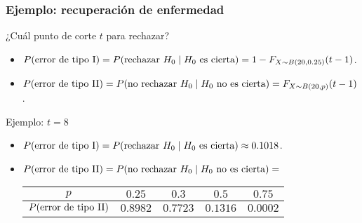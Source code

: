 \documentclass[table]{beamer}
\begin{document}
\begin{frame}
    \frametitle{Ejemplo: recuperación de enfermedad}
    \begin{block}{¿Cuál punto de corte $t$ para rechazar?}
        \begin{itemize}
            \item $\prob{\text{error de tipo I}} = \prob{\text{rechazar } H_{0} \mid H_{0} \text{ es cierta}}
                    = 1 - \pFF{X \sim \binomial{20}{0.25}}{t - 1}$.
            \item $\prob{\text{error de tipo II}} = \prob{\text{no rechazar } H_{0} \mid H_{0} \text{ no es cierta}} = \pFF{X \sim \binomial{20}{p}}{t - 1}$.
        \end{itemize}
    \end{block}
    \begin{exampleblock}{Ejemplo: $t = 8$}
        \begin{itemize}
            \item $\prob{\text{error de tipo I}} = \prob{\text{rechazar } H_{0} \mid H_{0} \text{ es cierta}}
                    \approx 0.1018$.
            \item $\prob{\text{error de tipo II}} = \prob{\text{no rechazar } H_{0} \mid H_{0} \text{ no es cierta}} =$
                \begin{center}
                    \begin{tabular}{c|cccc}
                        $p$ & $0.25$ & $0.3$ & $0.5$ & $0.75$ \\
                        \hline
                        $\prob{\text{error de tipo II}}$ & $0.8982$ & $0.7723$ & $0.1316$ & $0.0002$
                    \end{tabular}
                \end{center}
        \end{itemize}
    \end{exampleblock}
    \begin{center}
    \end{center}
\end{frame}
\end{document}
